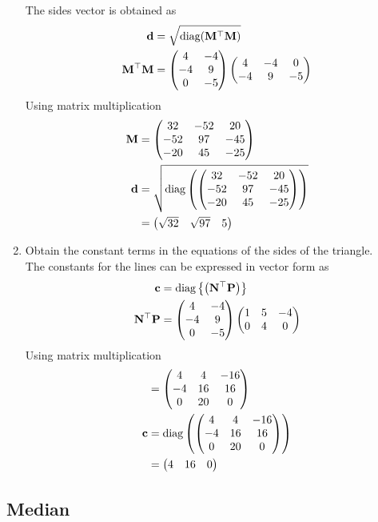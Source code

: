 \documentclass[11pt]{book}
\begin{document}
\begin{enumerate}[label=\thesubsection.\arabic*.,ref=\thesubsection.\theenumi]
\solution The sides vector is obtained as
\begin{align}
\mathbf{d} &= \sqrt{\text{diag}(\mathbf{M}^{\top}\mathbf{M})}\\
\mathbf{M}^{\top}\mathbf{M} &= \begin{pmatrix}4&-4 \\ -4 &9 \\ 0 &-5\end{pmatrix}\begin{pmatrix}4 & -4 & 0 \\ -4 & 9 & -5\end{pmatrix}
\end{align} 
Using matrix multiplication 
\begin{align}
    \mathbf{M} &= \begin{pmatrix} 32 & -52 & 20 \\ -52 & 97 & -45 \\ -20 & 45 & -25\end{pmatrix} \\
    \mathbf{d} &= \sqrt{\text{diag}\left(\begin{pmatrix} 32 & -52 & 20 \\ -52 & 97 & -45 \\ -20 & 45 & -25\end{pmatrix}\right)} \\
    &= \begin{pmatrix} \sqrt{32} & \sqrt{97} & 5\end{pmatrix}
\end{align}

\item Obtain the constant terms in the equations of the sides of the triangle. \\
\solution The constants for the lines can be expressed in vector form as
\begin{align}
\mathbf{c} &= \text{diag}\left\{\left(\mathbf{N}^{\top}\mathbf{P}\right)\right\}  \\
\mathbf{N}^{\top}\mathbf{P} &= \begin{pmatrix}4&-4 \\ -4 &9 \\ 0 &-5\end{pmatrix}\begin{pmatrix}1 & 5 & -4 \\ 0 & 4 & 0\end{pmatrix} \\
\end{align}
Using matrix multiplication
\begin{align}
    &=\begin{pmatrix} 4 & 4 & -16 \\ -4 & 16 & 16 \\ 0 & 20 & 0 \end{pmatrix} \\
    \mathbf{c} &= \text{diag}\left( \begin{pmatrix} 4 & 4 & -16 \\ -4 & 16 & 16 \\ 0 & 20 & 0 \end{pmatrix}\right) \\
    &= \begin{pmatrix} 4 & 16 & 0\end{pmatrix}
\end{align}
\end{enumerate}


\subsection{Median}
\end{document}
